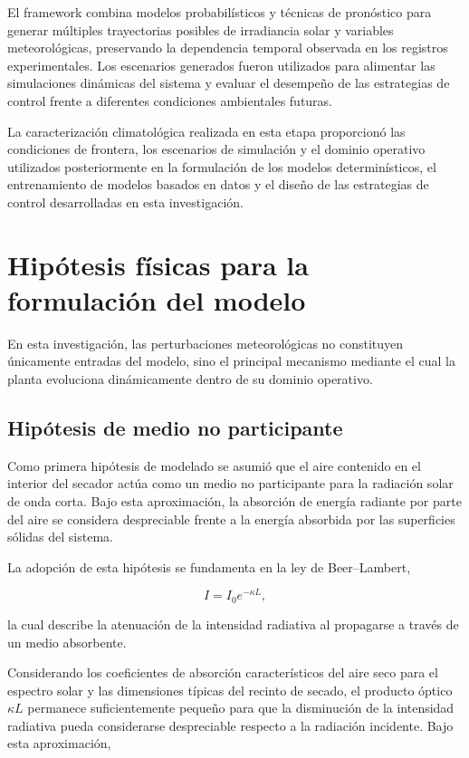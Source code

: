 El framework combina modelos probabilísticos y técnicas de pronóstico para generar múltiples trayectorias posibles de irradiancia solar y variables meteorológicas, preservando la dependencia temporal observada en los registros experimentales. Los escenarios generados fueron utilizados para alimentar las simulaciones dinámicas del sistema y evaluar el desempeño de las estrategias de control frente a diferentes condiciones ambientales futuras.

La caracterización climatológica realizada en esta etapa proporcionó las condiciones de frontera, los escenarios de simulación y el dominio operativo utilizados posteriormente en la formulación de los modelos determinísticos, el entrenamiento de modelos basados en datos y el diseño de las estrategias de control desarrolladas en esta investigación.


\section{Hipótesis físicas para la formulación del modelo}

En esta investigación, las perturbaciones meteorológicas no constituyen únicamente entradas del modelo, sino el principal mecanismo mediante el cual la planta evoluciona dinámicamente dentro de su dominio operativo.

\subsection{Hipótesis de medio no participante}

Como primera hipótesis de modelado se asumió que el aire contenido en el interior del secador actúa como un medio no participante para la radiación solar de onda corta. Bajo esta aproximación, la absorción de energía radiante por parte del aire se considera despreciable frente a la energía absorbida por las superficies sólidas del sistema.

La adopción de esta hipótesis se fundamenta en la ley de Beer--Lambert,

\begin{equation}
I=I_0e^{-\kappa L},
\end{equation}

la cual describe la atenuación de la intensidad radiativa al propagarse a través de un medio absorbente.

Considerando los coeficientes de absorción característicos del aire seco para el espectro solar y las dimensiones típicas del recinto de secado, el producto óptico $\kappa L$ permanece suficientemente pequeño para que la disminución de la intensidad radiativa pueda considerarse despreciable respecto a la radiación incidente. Bajo esta aproximación,

